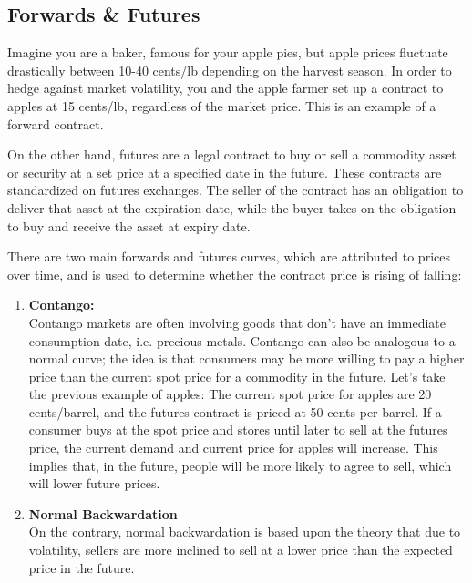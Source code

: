 \documentclass[12pt]{article}
\begin{document}
\subsection{Forwards \& Futures}
Imagine you are a baker, famous for your apple pies, but apple prices fluctuate drastically between 10-40 cents/lb depending on the harvest season. In order to hedge against market volatility, you and the apple farmer set up a contract to apples at 15 cents/lb, regardless of the market price. This is an example of a forward contract. 

On the other hand, futures are a legal contract to buy or sell a commodity asset or security at a set price at a specified date in the future. These contracts are standardized on futures exchanges. The seller of the contract has an obligation to deliver that asset at the expiration date, while the buyer takes on the obligation to buy and receive the asset at expiry date.

There are two main forwards and futures curves, which are attributed to prices over time, and is used to determine whether the contract price is rising of falling:
\begin{enumerate}
    \renewcommand{\labelenumi}{\alph{enumi}.}
    
    \item \textbf{Contango:} \\ 
    Contango markets are often involving goods that don't have an immediate consumption date, i.e. precious metals. Contango can also be analogous to a normal curve; the idea is that consumers may be more willing to pay a higher price than the current spot price for a commodity in the future. Let's take the previous example of apples: The current spot price for apples are 20 cents/barrel, and the futures contract is priced at 50 cents per barrel. If a consumer buys at the spot price and stores until later to sell at the futures price, the current demand and current price for apples will increase. This implies that, in the future, people will be more likely to agree to sell, which will lower future prices.
    \item \textbf{Normal Backwardation} \\
    On the contrary, normal backwardation is based upon the theory that due to volatility, sellers are more inclined to sell at a lower price than the expected price in the future. 
\end{enumerate}
\end{document}
